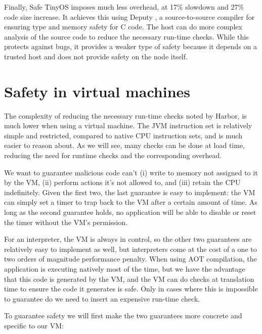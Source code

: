 Finally, Safe TinyOS \cite{Cooprider:2007ub} imposes much less overhead, at 17\% slowdown and 27\% code size increase. It achieves this using Deputy \cite{Condit:2007uo}, a source-to-source compiler for ensuring type and memory safety for C code. The host can do more complex analysis of the source code to reduce the necessary run-time checks. While this protects against bugs, it provides a weaker type of safety because it depends on a trusted host and does not provide safety on the node itself.

\section{Safety in virtual machines}


The complexity of reducing the necessary run-time checks noted by Harbor, is much lower when using a virtual machine. The JVM instruction set is relatively simple and restricted, compared to native CPU instruction sets, and is much easier to reason about. As we will see, many checks can be done at load time, reducing the need for runtime checks and the corresponding overhead.

We want to guarantee malicious code can't (i) write to memory not assigned to it by the VM, (ii) perform actions it's not allowed to, and (iii) retain the CPU indefinitely. Given the first two, the last guarantee is easy to implement: the VM can simply set a timer to trap back to the VM after a certain amount of time. As long as the second guarantee holds, no application will be able to disable or reset the timer without the VM's permission.

For an interpreter, the VM is always in control, so the other two guarantees are relatively easy to implement as well, but interpreters come at the cost of a one to two orders of magnitude performance penalty. When using AOT compilation, the application is executing natively most of the time, but we have the advantage that this code is generated by the VM, and the VM can do checks at translation time to ensure the code it generates is safe. Only in cases where this is impossible to guarantee do we need to insert an expensive run-time check.

To guarantee safety we will first make the two guarantees more concrete and specific to our VM:

